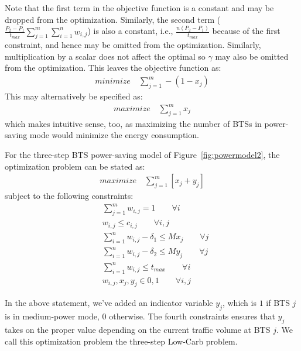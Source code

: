 Note that the first term in the objective function is a constant and may be dropped from the optimization. Similarly, the second term ($\frac{P_2-P_1}{t_{max}}\sum\limits_{j=1}^{m}\sum\limits_{i=1}^{n}w_{i,j}$) is also a constant, i.e., $\frac{n(P_2-P_1)}{t_{max}}$ because of the first constraint, and hence may be omitted from the optimization. Similarly, multiplication by a scalar does not affect the optimal so $\gamma$ may also be omitted from the optimization. This leaves the objective function as:
\begin{align}
\textit{minimize} \quad \sum_{j=1}^{m} -(1-x_j)
\end{align}
This may alternatively be specified as:
\begin{align}
\textit{maximize} \quad \sum_{j=1}^{m} x_j
\end{align}
which makes intuitive sense, too, as maximizing the number of BTSs in power-saving mode would minimize the energy consumption.


For the three-step BTS power-saving model of Figure~\ref{fig:powermodel2}, the optimization problem can be stated as:
\begin{align}
\textit{maximize} \quad \sum_{j=1}^{m} \left[
x_j+y_j
\right]
\end{align}
subject to the following constraints:
\begin{align}
& \sum_{j=1}^m w_{i,j} = 1 \qquad \forall i \\
& w_{i,j} \leq c_{i,j} \qquad \forall i, j \\
& \sum_{i=1}^nw_{i,j}-\delta_1 \leq Mx_j \qquad \forall j\\
& \sum_{i=1}^nw_{i,j}-\delta_2 \leq My_j \qquad \forall j\\
& \sum_{i=1}^n w_{i,j} \le t_{max} \qquad \forall i \\
& w_{i,j}, x_j, y_j\in {0,1} \qquad \forall i, j%
\end{align}

In the above statement, we've added an indicator variable $y_j$, which is $1$ if BTS $j$ is in medium-power mode, $0$ otherwise. The fourth constraints ensures that $y_j$ takes on the proper value depending on the current traffic volume at BTS $j$. We call this optimization problem the three-step Low-Carb problem.


